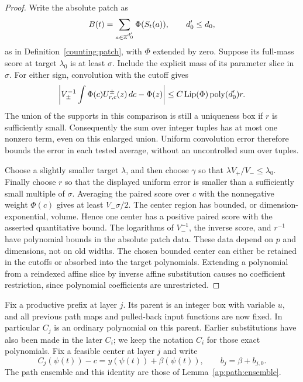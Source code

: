 \begin{proof}
Write the absolute patch as
\[
 B(t)=\sum_{a\in\mathbb Z^{d_0'}}\Phi(S_t(a)),\qquad d_0'\leq d_0,
\]
as in Definition~\ref{counting:patch}, with $\Phi$ extended by zero.
Suppose its full-mass score at target $\lambda_0$ is at least $\sigma$.
Include the explicit mass of its parameter slice in $\sigma$.
For either sign, convolution with the cutoff gives
\[
 \left|V_\pm^{-1}\int\Phi(c)U^\pm_{r,c}(z)\,dc-\Phi(z)\right|
 \leq C\operatorname{Lip}(\Phi)\operatorname{poly}(d_0')r.
\]
The union of the supports in this comparison is still a uniqueness
box if $r$ is sufficiently small.  Consequently the sum over integer
tuples has at most one nonzero term, even on this enlarged union.
Uniform convolution error therefore bounds the error in each tested
average, without an uncontrolled sum over tuples.

Choose a slightly smaller target $\lambda$, and then choose $\gamma$
so that $\lambda V_+/V_-\leq\lambda_0$.  Finally choose $r$ so that
the displayed uniform error is smaller than a sufficiently small
multiple of $\sigma$.  Averaging the paired score over $c$ with the
nonnegative weight $\Phi(c)$ gives at least $V_-\sigma/2$.
The center region has bounded, or dimension-exponential, volume.
Hence one center has a positive paired score with the asserted
quantitative bound.  The logarithms of $V_-^{-1}$, the inverse score,
and $r^{-1}$ have polynomial bounds in the absolute patch data.
These data depend on $p$ and dimensions, not on old widths.
The chosen bounded center can either be retained in the cutoffs or
absorbed into the target polynomials.  Extending a polynomial from a
reindexed affine slice by inverse affine substitution causes no
coefficient restriction, since polynomial coefficients are unrestricted.
\end{proof}

Fix a productive prefix at layer $j$.  Its parent is an integer box
with variable $u$, and all previous path maps and pulled-back input
functions are now fixed.  In particular $C_j$ is an ordinary
polynomial on this parent.  Earlier substitutions have also been
made in the later $C_i$; we keep the notation $C_i$ for those exact
polynomials.  Fix a feasible center at layer $j$ and write
\[
 C_j(\psi(t))-c=y(\psi(t))+\beta(\psi(t)),
 \qquad b_j=\beta+b_{j,0}.
\]
The path ensemble and this identity are those of
Lemma~\ref{ap:path:ensemble}.

